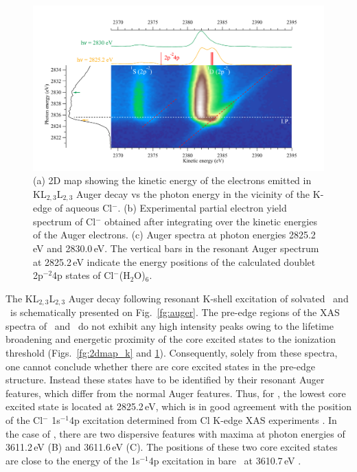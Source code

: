 \begin{figure}[h!]
\centering
\includegraphics[scale=0.55]{figures/cl_2dmap.pdf}
\caption{(a) 2D map showing the kinetic energy of the electrons emitted in KL$_{2,3}$L$_{2,3}$ Auger decay vs the photon energy in the vicinity of the K-edge of aqueous Cl$^{-}$. 
(b) Experimental partial electron yield spectrum of Cl$^{-}$ obtained after integrating over the kinetic energies of the Auger electrons. 
(c) Auger spectra at photon energies 2825.2\,eV and 2830.0\,eV. The vertical bars in the resonant Auger spectrum at 2825.2\,eV indicate the energy positions of the calculated doublet 2p$^{-2}$4p states of Cl$^{-}$(H$_2$O)$_6$.}
\label{fg:2dmap_cl}
\end{figure}


The KL$_{2,3}$L$_{2,3}$ Auger decay following resonant K-shell excitation of solvated \ki~and \cli~is schematically presented on Fig.\ \ref{fg:auger}. The pre-edge regions of the XAS spectra of \ki~and \cli~do not exhibit any high intensity peaks owing to the lifetime broadening and energetic proximity of the core excited states to the ionization threshold (Figs.\ \ref{fg:2dmap_k} and \ref{fg:2dmap_cl}). Consequently, solely from these spectra, one cannot conclude whether there are core excited states in the pre-edge structure. Instead these states have to be identified by their resonant Auger features, which differ from the normal Auger features. Thus, for \cli, the lowest core excited state is located at 2825.2\,eV, which is in good agreement with the position of the Cl$^{-}$ 1s$^{-1}$4p excitation determined from Cl K-edge XAS experiments \citep{sugiura82:681,shadle95:2259}. In the case of \ki, there are two dispersive features with maxima at photon energies of 3611.2\,eV (B) and 3611.6\,eV (C). The positions of these two core excited states are close to the energy of the 1s$^{-1}$4p excitation in bare \ki~at 3610.7\,eV \citep{hertlein06:062715}.



